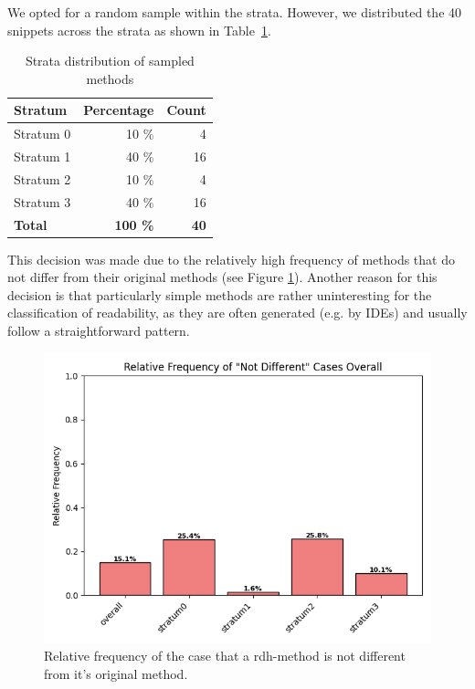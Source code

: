 \documentclass[%
class=scrreprt,
chapterprefix=false,%
open=right,%
twoside=false,%
paper=a4,%
logofile={Logo\_zentral\_farbig\_EN.png},%
thesistype=master,%
UKenglish,%
]{se2thesis}
\theoremstyle{definition}
\begin{document}
	We opted for a random sample within the strata. However, we distributed the 40 snippets across the strata as shown in Table~\ref{tab:sampled_methods}.
	
	\begin{table}[htbp]
		\centering
		\caption{Strata distribution of sampled methods}
		\vspace{8pt}
		\label{tab:sampled_methods}
		\begin{tabular}{lrr}
			\toprule
			\textbf{Stratum} & \textbf{Percentage} & \textbf{Count} \\
			\midrule
			Stratum 0 & 10 \% & 4 \\
			Stratum 1 & 40 \% & 16 \\
			Stratum 2 & 10 \% & 4 \\
			Stratum 3 & 40 \% & 16 \\
			\midrule
			\textbf{Total} & \textbf{100 \%} & \textbf{40} \\
			\bottomrule
		\end{tabular}

	\end{table}
	
	This decision was made due to the relatively high frequency of methods that do not differ from their original methods (see Figure \ref{fig:sampling_not_different_overall}). Another reason for this decision is that particularly simple methods are rather uninteresting for the classification of readability, as they are often generated (e.g. by IDEs) and usually follow a straightforward pattern.
	
	\begin{figure}[t]
		\centering
		\includegraphics[width=\textwidth]{img/sampling_not_different_overall.png}
		\caption{Relative frequency of the case that a rdh-method is not different from it's original method.} 
		\label{fig:sampling_not_different_overall}
	\end{figure}
		
\end{document}
